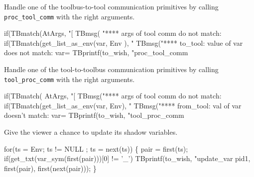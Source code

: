 
Handle one of the toolbus-to-tool communication primitives
by calling {\tt proc\_tool\_comm} with the right arguments.

\nwenddocs{}\endmoddef\nwstartdeflinemarkup{}\nwenddeflinemarkup
  if(TBmatch(AtArgs, "[%
    TBmsg( "**** args of tool comm do not match:%
  if(TBmatch(get_list_as_env(var, Env ), "%
    TBmsg("**** to_tool: value of var does not match: var=%
  TBprintf(to_wish, "proc_tool_comm %
\nwendcode{}\nwdocspar


Handle one of the tool-to-toolbus communication primitives
by calling {\tt tool\_proc\_comm} with the right arguments.

\nwenddocs{}\endmoddef\nwstartdeflinemarkup{}\nwenddeflinemarkup
  if(TBmatch( AtArgs, "[%
    TBmsg("**** args of tool comm do not match:%
  if(TBmatch(get_list_as_env(var, Env), "%
    TBmsg("**** from_tool: val of var doesn't match: var=%
  TBprintf(to_wish, "tool_proc_comm %
\nwendcode{}\nwdocspar


Give the viewer a chance to update its shadow variables.

\nwenddocs{}\endmoddef\nwstartdeflinemarkup{}\nwenddeflinemarkup
  for(ts = Env; ts != NULL ; ts = next(ts)) \{
    pair = first(ts);
    if(get_txt(var_sym(first(pair)))[0] != '_')
    TBprintf(to_wish, "update_var %
                                pid1, first(pair), first(next(pair)));
  \}
\nwendcode{}\nwdocspar

